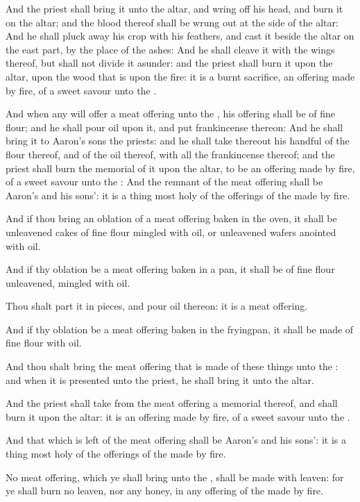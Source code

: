 \Verse And the priest shall bring it unto the altar, and wring off his head, and burn it on the altar; and the blood thereof shall be wrung out at the side of the altar: \Verse And he shall pluck away his crop with his feathers, and cast it beside the altar on the east part, by the place of the ashes: \Verse And he shall cleave it with the wings thereof, but shall not divide it asunder: and the priest shall burn it upon the altar, upon the wood that is upon the fire: it is a burnt sacrifice, an offering made by fire, of a sweet savour unto the \LORD.

\Chapter
\Verse And when any will offer a meat offering unto the \LORD, his offering shall be of fine flour; and he shall pour oil upon it, and put frankincense thereon: \Verse And he shall bring it to Aaron's sons the priests: and he shall take thereout his handful of the flour thereof, and of the oil thereof, with all the frankincense thereof; and the priest shall burn the memorial of it upon the altar, to be an offering made by fire, of a sweet savour unto the \LORD: \Verse And the remnant of the meat offering shall be Aaron's and his sons': it is a thing most holy of the offerings of the \LORD made by fire.

\Verse And if thou bring an oblation of a meat offering baken in the oven, it shall be unleavened cakes of fine flour mingled with oil, or unleavened wafers anointed with oil.

\Verse And if thy oblation be a meat offering baken in a pan, it shall be of fine flour unleavened, mingled with oil.

\Verse Thou shalt part it in pieces, and pour oil thereon: it is a meat offering.

\Verse And if thy oblation be a meat offering baken in the fryingpan, it shall be made of fine flour with oil.

\Verse And thou shalt bring the meat offering that is made of these things unto the \LORD: and when it is presented unto the priest, he shall bring it unto the altar.

\Verse And the priest shall take from the meat offering a memorial thereof, and shall burn it upon the altar: it is an offering made by fire, of a sweet savour unto the \LORD.

\Verse And that which is left of the meat offering shall be Aaron's and his sons': it is a thing most holy of the offerings of the \LORD made by fire.

\Verse No meat offering, which ye shall bring unto the \LORD, shall be made with leaven: for ye shall burn no leaven, nor any honey, in any offering of the \LORD made by fire.

